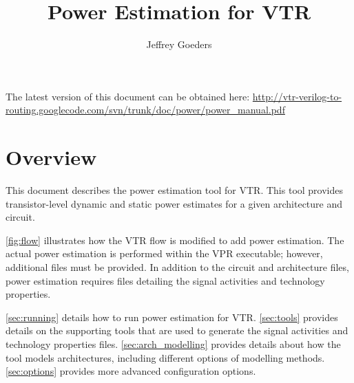 \documentclass[letterpaper,twoside,10pt]{article}
\begin{document}
\renewcommand*{\chapterautorefname}{Chapter}
\renewcommand*{\sectionautorefname}{Section}
\renewcommand*{\subsectionautorefname}{Section}
\renewcommand*{\subsubsectionautorefname}{Section}

\title{Power Estimation for VTR}
\author{Jeffrey Goeders}
\maketitle

The latest version of this document can be obtained here: \url{http://vtr-verilog-to-routing.googlecode.com/svn/trunk/doc/power/power_manual.pdf}

\setcounter{tocdepth}{2}
\tableofcontents %


\newpage
\section{Overview}
This document describes the power estimation tool for VTR.  This tool provides transistor-level dynamic and static power estimates for a given architecture and circuit.

\autoref{fig:flow} illustrates how the VTR flow is modified to add power estimation.  The actual power estimation is performed within the VPR executable; however, additional files must be provided.  In addition to the circuit and architecture files, power estimation requires files detailing the signal activities and technology properties.  

\autoref{sec:running} details how to run power estimation for VTR.  \autoref{sec:tools} provides details on the supporting tools that are used to generate the signal activities and technology properties files.  \autoref{sec:arch_modelling} provides details about how the tool models architectures, including different options of modelling methods.  \autoref{sec:options} provides more advanced configuration options.
\end{document}
